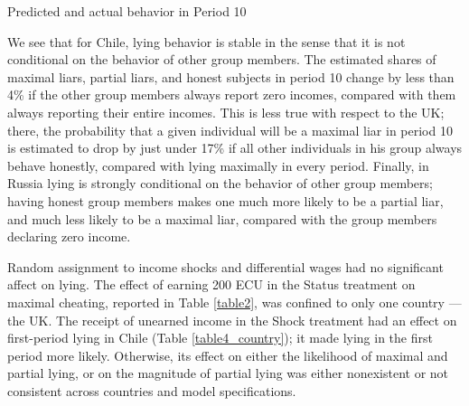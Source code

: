 \documentclass[12pt]{article}
\begin{document}
\begin{table}[ht]
\begin{center}

\end{center}
\caption{Predicted and actual behavior in Period 10}
\label{table_out}
\end{table}

\par We see that for Chile, lying behavior is stable in the sense that it is not conditional on the behavior of other group members. The estimated shares of maximal liars, partial liars, and honest subjects in period 10 change by less than 4\% if the other group members always report zero incomes, compared with them always reporting their entire incomes. This is less true with respect to the UK; there, the probability that a given individual will be a maximal liar in period 10 is estimated to drop by just under 17\% if all other individuals in his group always behave honestly, compared with 
lying maximally in every period. Finally, in Russia lying is strongly conditional on the behavior of other group members; having honest group members makes one much more likely to be a partial liar, and much less likely to be a maximal liar, compared with the group members declaring zero income. 







\par Random assignment to income shocks and differential wages had no significant affect on lying.  The effect of earning 200 ECU in the Status treatment on maximal cheating, reported in Table \ref{table2}, was confined to only one country --- the UK. The receipt of unearned income in the Shock treatment had an effect on first-period lying in Chile (Table \ref{table4_country}); it made lying in the first period more likely. Otherwise, its effect on either the likelihood of maximal and partial lying, or on the magnitude of partial lying was either nonexistent or not consistent across countries and model specifications.
\end{document}
